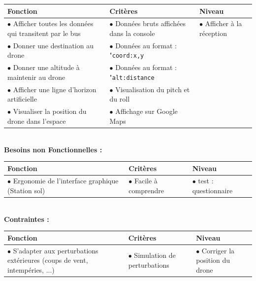 \documentclass[12pt,a4paper]{article}
\begin{document}
\begin{tabular}{|p{6cm}|p{5cm}|p{5cm}|}
	\hline
       Fonction  & Critères  & Niveau\\
    \hline
    	$\bullet$ Afficher toutes les données qui transitent par le bus & $\bullet$ Données bruts affichées dans la console & $\bullet$ Afficher à la réception\\
		$\bullet$ Donner une destination au drone & $\bullet$ Données au format : "\texttt{coord:x,y} & \\
      	$\bullet$ Donner une altitude à maintenir au drone & $\bullet$ Données au format : "\texttt{alt:distance} & \\
      	$\bullet$ Afficher une ligne d'horizon artificielle & $\bullet$ Visualisation du pitch et du roll & \\
		$\bullet$ Visualiser la position du drone dans l'espace & $\bullet$ Affichage sur Google Maps & \\
    \hline
\end{tabular}\\

\newpage
\textbf{Besoins non Fonctionnelles :}\\
\newline

\begin{tabular}{|p{7cm}|p{5cm}|p{4cm}|}
	\hline
       Fonction  & Critères  & Niveau\\
    \hline
    	$\bullet$ Ergonomie de l'interface graphique (Station sol) & $\bullet$ Facile à comprendre & $\bullet$ test : questionnaire\\
    \hline
\end{tabular}\\

\textbf{Contraintes :}\\


\begin{tabular}{|p{7cm}|p{5cm}|p{4cm}|}
	\hline
       Fonction  & Critères  & Niveau\\
    \hline
    	$\bullet$ S'adapter aux perturbations extérieures (coups de vent, intempéries, ...) & $\bullet$ Simulation de perturbations & $\bullet$ Corriger la position du drone \\
    \hline
\end{tabular}\\
\newline
\end{document}

